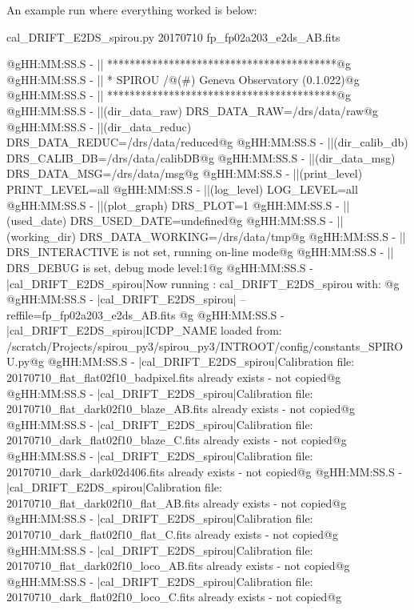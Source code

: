 An example run where everything worked is below:
\begin{cmdbox}[title={example}]
cal_DRIFT_E2DS_spirou.py 20170710 fp_fp02a203_e2ds_AB.fits
\end{cmdbox}
\begin{cmdboxprintspecial}[fontupper=\tiny, fontlower=\tiny]
@gHH:MM:SS.S -   || *****************************************@g
@gHH:MM:SS.S -   || * SPIROU /@(#) Geneva Observatory (0.1.022)@g
@gHH:MM:SS.S -   || *****************************************@g
@gHH:MM:SS.S -   ||(dir_data_raw)      DRS_DATA_RAW=/drs/data/raw@g
@gHH:MM:SS.S -   ||(dir_data_reduc)    DRS_DATA_REDUC=/drs/data/reduced@g
@gHH:MM:SS.S -   ||(dir_calib_db)      DRS_CALIB_DB=/drs/data/calibDB@g
@gHH:MM:SS.S -   ||(dir_data_msg)      DRS_DATA_MSG=/drs/data/msg@g
@gHH:MM:SS.S -   ||(print_level)       PRINT_LEVEL=all         %
@gHH:MM:SS.S -   ||(log_level)         LOG_LEVEL=all         %
@gHH:MM:SS.S -   ||(plot_graph)        DRS_PLOT=1            %
@gHH:MM:SS.S -   ||(used_date)         DRS_USED_DATE=undefined@g
@gHH:MM:SS.S -   ||(working_dir)       DRS_DATA_WORKING=/drs/data/tmp@g
@gHH:MM:SS.S -   ||                    DRS_INTERACTIVE is not set, running on-line mode@g
@gHH:MM:SS.S -   ||                    DRS_DEBUG is set, debug mode level:1@g
@gHH:MM:SS.S -   |cal_DRIFT_E2DS_spirou|Now running : cal_DRIFT_E2DS_spirou with: @g
@gHH:MM:SS.S -   |cal_DRIFT_E2DS_spirou|       -- reffile=fp_fp02a203_e2ds_AB.fits @g
@gHH:MM:SS.S -   |cal_DRIFT_E2DS_spirou|ICDP_NAME loaded from: /scratch/Projects/spirou_py3/spirou_py3/INTROOT/config/constants_SPIROU.py@g
@gHH:MM:SS.S -   |cal_DRIFT_E2DS_spirou|Calibration file: 20170710_flat_flat02f10_badpixel.fits already exists - not copied@g
@gHH:MM:SS.S -   |cal_DRIFT_E2DS_spirou|Calibration file: 20170710_flat_dark02f10_blaze_AB.fits already exists - not copied@g
@gHH:MM:SS.S -   |cal_DRIFT_E2DS_spirou|Calibration file: 20170710_dark_flat02f10_blaze_C.fits already exists - not copied@g
@gHH:MM:SS.S -   |cal_DRIFT_E2DS_spirou|Calibration file: 20170710_dark_dark02d406.fits already exists - not copied@g
@gHH:MM:SS.S -   |cal_DRIFT_E2DS_spirou|Calibration file: 20170710_flat_dark02f10_flat_AB.fits already exists - not copied@g
@gHH:MM:SS.S -   |cal_DRIFT_E2DS_spirou|Calibration file: 20170710_dark_flat02f10_flat_C.fits already exists - not copied@g
@gHH:MM:SS.S -   |cal_DRIFT_E2DS_spirou|Calibration file: 20170710_flat_dark02f10_loco_AB.fits already exists - not copied@g
@gHH:MM:SS.S -   |cal_DRIFT_E2DS_spirou|Calibration file: 20170710_dark_flat02f10_loco_C.fits already exists - not copied@g

\end{cmdboxprintspecial}
